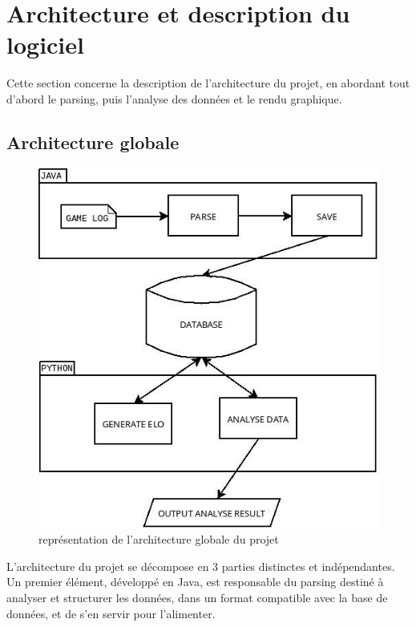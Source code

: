 \chapter{Architecture et description du logiciel}
Cette section concerne la description de l'architecture du projet, en abordant tout d'abord le parsing, puis l'analyse des données et le rendu graphique.


\section{Architecture globale}

\begin{figure}[!h]
  \begin{center}
    \includegraphics[scale=0.45, keepaspectratio]{./presentation/overview.jpg}
  \end{center}
  \caption{représentation de l'architecture globale du projet}
\end{figure}

L'architecture du projet se décompose en 3 parties distinctes et indépendantes. Un premier élément, développé en Java, est responsable du parsing destiné à analyser et structurer les données, dans un format compatible avec la base de données, et de s'en servir pour l'alimenter.\\

